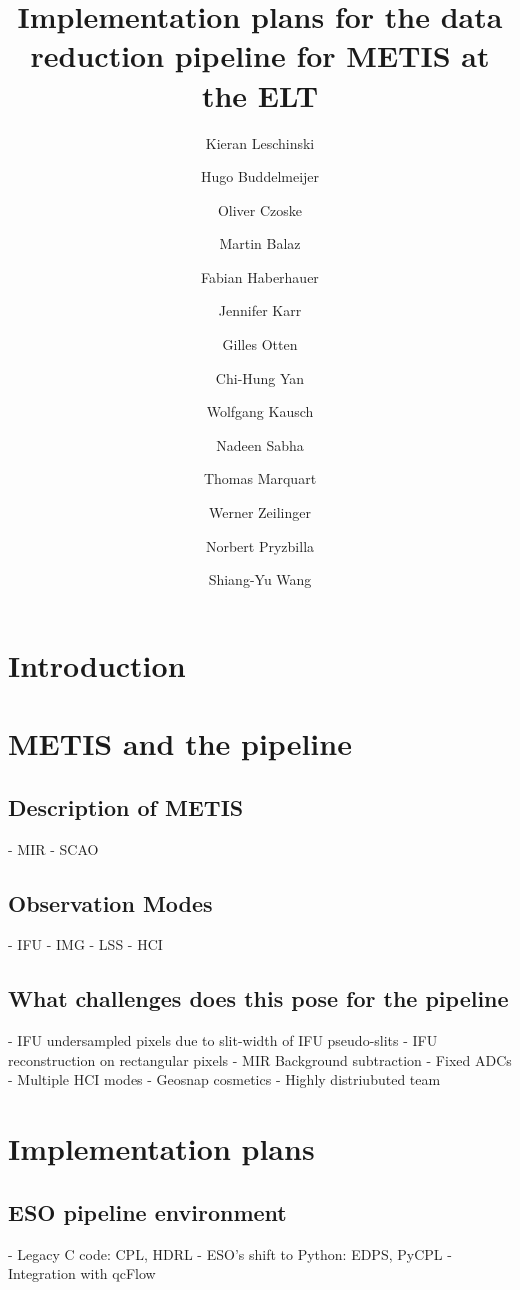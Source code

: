 \documentclass[]{spie}  %
\title{Implementation plans for the data reduction pipeline for METIS at the ELT }
\author[a]{Kieran Leschinski}
\author[a]{Hugo Buddelmeijer}
\author[a]{Oliver Czoske}
\author[a]{Martin Balaz}
\author[a]{Fabian Haberhauer}
\author[a]{Jennifer Karr}
\author[a]{Gilles Otten}
\author[a]{Chi-Hung Yan}
\author[a]{Wolfgang Kausch}
\author[a]{Nadeen Sabha}
\author[a]{Thomas Marquart}
\author[a]{Werner Zeilinger}
\author[a]{Norbert Pryzbilla}
\author[a]{Shiang-Yu Wang}
\affil[a]{University of Vienna, T\"urkenschanztra\ss e 18, 1180 Vienna, Austria}
\begin{document}
 
\maketitle

\begin{abstract}

\end{abstract}



\section{Introduction}
\label{sec:introduction}


\section{METIS and the pipeline}
\label{sec:environment}

\subsection{Description of METIS}
\label{ssec:env_metis}
	- MIR
	- SCAO
\subsection{Observation Modes}
\label{ssec:env_modes}
	- IFU
	- IMG
	- LSS
	- HCI
 
\subsection{What challenges does this pose for the pipeline}
\label{ssec:env_challenges}

- IFU undersampled pixels due to slit-width of IFU pseudo-slits
		- IFU reconstruction on rectangular pixels
	- MIR Background subtraction
	- Fixed ADCs
	- Multiple HCI modes
	- Geosnap cosmetics
	- Highly distriubuted team


\section{Implementation plans}
\label{sec:implementation}

\subsection{ESO pipeline environment}
	- Legacy C code: CPL, HDRL
	- ESO's shift to Python: EDPS, PyCPL
	- Integration with qcFlow
\end{document}
